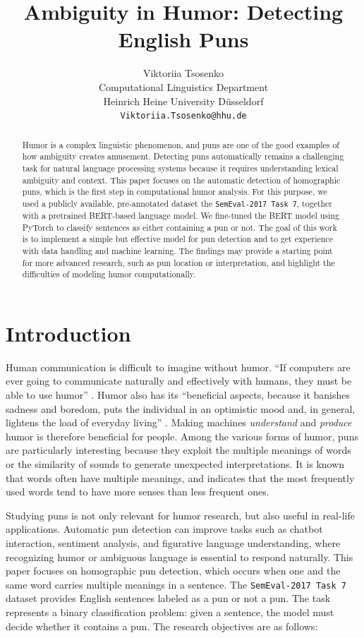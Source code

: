 \documentclass[11pt,a4paper]{article}
\title{Ambiguity in Humor: Detecting English Puns}
\author{Viktoriia Tsosenko \\
  Computational Linguistics Department \\
  Heinrich Heine University D\"usseldorf \\
  \texttt{Viktoriia.Tsosenko@hhu.de} \\}
\date{}
\begin{document}
\maketitle
\pagestyle{plain}
\thispagestyle{plain}

\begin{abstract}
Humor is a complex linguistic phenomenon, and puns are one of the good examples of how ambiguity creates amusement. Detecting puns automatically remains a challenging task for natural language processing systems because it requires understanding lexical ambiguity and context. This paper focuses on the automatic detection of homographic puns, which is the first step in computational humor analysis. For this purpose, we used a publicly available, pre-annotated dataset the \texttt{SemEval-2017 Task 7}, together with a pretrained BERT-based language model. We fine-tuned the BERT model using PyTorch to classify sentences as either containing a pun or not. The goal of this work is to implement a simple but effective model for pun detection and to get experience with data handling and machine learning.
The findings may provide a starting point for more advanced research, such as pun location or interpretation, and highlight the difficulties of modeling humor computationally.
\end{abstract}


\section{Introduction}

Human communication is difficult to imagine without humor. “If computers are ever going to communicate naturally and effectively with humans, they must be able to use humor” \citep[][p.59]{binsted2006computational}. Humor also has its “beneficial aspects, because it banishes sadness and boredom, puts the individual in an optimistic mood and, in general, lightens the load of everyday living” \citep[][p.4]{larkin2017overview}. Making machines \textit{understand} and \textit{produce} humor is therefore beneficial for people. Among the various forms of humor, puns are particularly interesting because they exploit the multiple meanings of words or the similarity of sounds to generate unexpected interpretations. It is known that words often have multiple meanings, and \citet{zipf1949human} indicates that the most frequently used words tend to have more senses than less frequent ones.

\vspace{4pt}
Studying puns is not only relevant for humor research, but also useful in real-life applications. Automatic pun detection can improve tasks such as chatbot interaction, sentiment analysis, and figurative language understanding, where recognizing humor or ambiguous language is essential to respond naturally.
This paper focuses on homographic pun detection, which occurs when one and the same word carries multiple meanings in a sentence. The \texttt{SemEval-2017 Task 7} dataset provides English sentences labeled as a pun or not a pun. The task represents a binary classification problem: given a sentence, the model must decide whether it contains a pun.
The research objectives are as follows:
\end{document}
